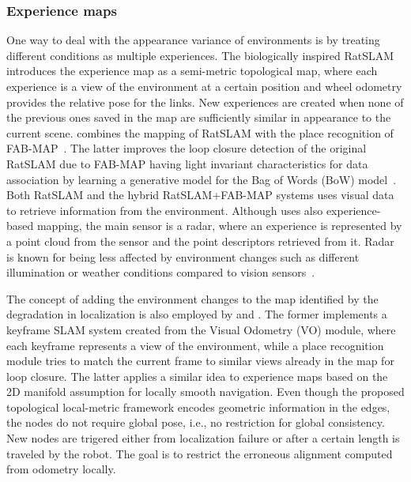 \subsubsection{Experience maps}
\label{sec:discussion:appearance:exp-maps}

One way to deal with the appearance variance of environments is by treating different conditions as multiple experiences.
The biologically inspired RatSLAM~\parencite{ball-et-al:2013:9} introduces the experience map as a semi-metric topological map, where each experience is a view of the environment at a certain position and wheel odometry provides the relative pose for the links. New experiences are created when none of the previous ones saved in the map are sufficiently similar in appearance to the current scene.
\cite{glover-et-al:2010:5509547} combines the mapping of RatSLAM with the place recognition of FAB-MAP~\parencite{discussion:fab-map}. The latter improves the loop closure detection of the original RatSLAM due to FAB-MAP having light invariant characteristics for data association by learning a generative model for the Bag of Words (BoW) model~\parencite{discussion:bow}.
Both RatSLAM and the hybrid RatSLAM+FAB-MAP systems uses visual data to retrieve information from the environment.
Although \cite{martini-et-al:2020:s20216002} uses also experience-based mapping, the main sensor is a radar, where an experience is represented by a point cloud from the sensor and the point descriptors retrieved from it. Radar is known for being less affected by environment changes such as different illumination or weather conditions compared to vision sensors~\parencite{hong-et-al:2022:02783649221080483}.

The concept of adding the environment changes to the map identified by the degradation in localization is also employed by \cite{konolige-bowman:2009:5354121} and \cite{tang-et-al:2019:7}.
The former implements a keyframe SLAM system created from the Visual Odometry (VO) module, where each keyframe represents a view of the environment, while a place recognition module tries to match the current frame to similar views already in the map for loop closure.
The latter applies a similar idea to experience maps based on the 2D manifold assumption for locally smooth navigation. Even though the proposed topological local-metric framework encodes geometric information in the edges, the nodes do not require global pose, i.e., no restriction for global consistency. New nodes are trigered either from localization failure or after a certain length is traveled by the robot. The goal is to restrict the erroneous alignment computed from odometry locally.

